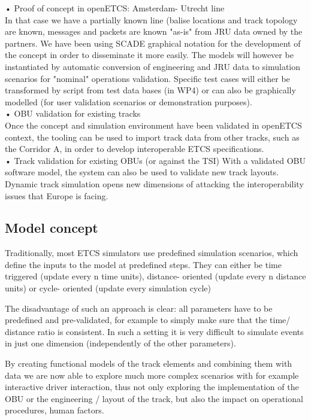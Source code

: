 •  	Proof of concept in openETCS: Amsterdam- Utrecht line\\
In that case we have a partially known line (balise locations and track topology are known, messages and packets are known "as-is" from JRU data owned by the partners.
We have been using SCADE graphical notation for the development of the concept in order to disseminate it more easily.
The models will however be instantiated by automatic conversion of engineering and JRU data to simulation scenarios for "nominal" operations validation.
Specific test cases will either be transformed by script from test data bases (in WP4) or can also be graphically modelled (for user validation scenarios or demonstration purposes).\\
•  	OBU validation for existing tracks\\
Once the concept and simulation environment have been validated in openETCS context, the tooling can be used to import track data from other tracks, such as the Corridor A, in order to develop interoperable ETCS specifications. \\
•  	Track validation for existing OBUs (or against the TSI)
With a validated OBU software model, the system can also be used to validate new track layouts.\\
Dynamic track simulation opens new dimensions of attacking the interoperability issues that Europe is facing.\\
%
%
\subsection{Model concept}

Traditionally, most ETCS simulators use predefined simulation scenarios, which define the inputs to the model at predefined steps.
They can either be time triggered (update every n time units), distance- oriented (update every n distance units) or cycle- oriented (update every simulation cycle)

The disadvantage of such an approach is clear: all parameters have to be predefined and pre-validated, for example to simply make sure that the time/ distance ratio is consistent.
In such a setting it is very difficult to simulate events in just one dimension (independently of the other parameters).

By creating functional models of the track elements and combining them with data we are now able to explore much more complex scenarios with for example interactive driver interaction, thus not only exploring the implementation of the OBU or the engineering / layout of the track, but also the impact on operational procedures, human factors.

